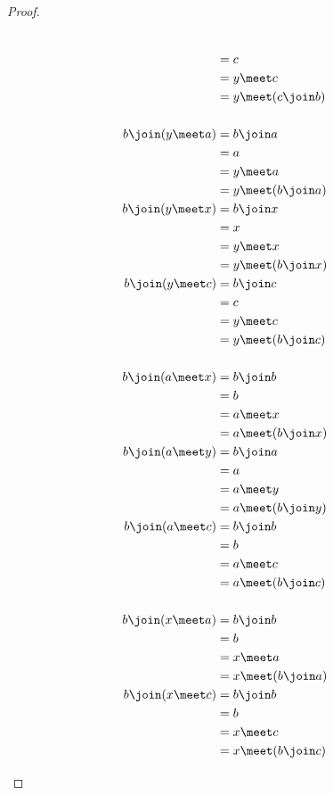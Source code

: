 \begin{proof}
\begin{enumerate}
\begin{multicols}{3}
\begin{align*}
      \\&= c
      \\&= y \meet c
      \\&= y \meet (c\join b)
      \\
      \\
      b \join ( y \meet a)
        &= b \join a
      \\&= a
      \\&= y \meet a
      \\&= y \meet (b\join a)
      \\
      b \join ( y \meet x)
        &= b \join x
      \\&= x
      \\&= y \meet x
      \\&= y \meet (b\join x)
      \\
      b \join (y \meet c)
        &= b \join c
      \\&= c
      \\&= y \meet c
      \\&= y \meet (b\join c)
      \\
      \\
      b \join (a \meet x)
        &= b \join b
      \\&= b
      \\&= a \meet x
      \\&= a \meet ( b\join x)
      \\
      b \join (a \meet y)
        &= b \join a
      \\&= a
      \\&= a \meet y
      \\&= a \meet ( b\join y)
      \\
      b \join (a \meet c)
        &= b \join b
      \\&= b
      \\&= a \meet c
      \\&= a \meet ( b\join c)
      \\
      \\
      b \join (x \meet a)
        &= b \join b
      \\&= b
      \\&= x \meet a
      \\&= x \meet ( b\join a)
      \\
      b \join (x \meet c)
        &= b \join b
      \\&= b
      \\&= x \meet c
      \\&= x \meet ( b\join c)
      \\

\end{align*}
\end{multicols}
\end{enumerate}
\end{proof}
